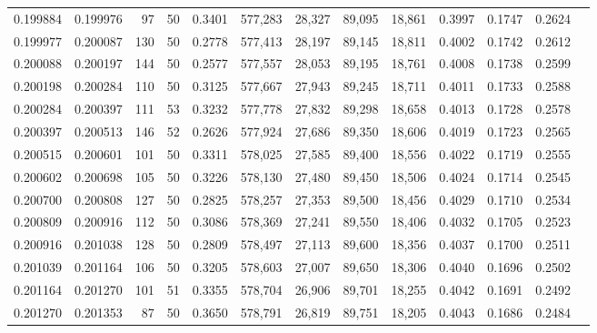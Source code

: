 \begin{tabular}{rrrrrrrrrrrrr}
0.199884 & 0.199976 &    97 &  50 &                                     0.3401 & 577,283 &  28,327 &  89,095 &  18,861 & 0.3997 & 0.1747 & 0.2624 \\
0.199977 & 0.200087 &   130 &  50 &                                     0.2778 & 577,413 &  28,197 &  89,145 &  18,811 & 0.4002 & 0.1742 & 0.2612 \\
0.200088 & 0.200197 &   144 &  50 &                                     0.2577 & 577,557 &  28,053 &  89,195 &  18,761 & 0.4008 & 0.1738 & 0.2599 \\
0.200198 & 0.200284 &   110 &  50 &                                     0.3125 & 577,667 &  27,943 &  89,245 &  18,711 & 0.4011 & 0.1733 & 0.2588 \\
0.200284 & 0.200397 &   111 &  53 &                                     0.3232 & 577,778 &  27,832 &  89,298 &  18,658 & 0.4013 & 0.1728 & 0.2578 \\
0.200397 & 0.200513 &   146 &  52 &                                     0.2626 & 577,924 &  27,686 &  89,350 &  18,606 & 0.4019 & 0.1723 & 0.2565 \\
0.200515 & 0.200601 &   101 &  50 &                                     0.3311 & 578,025 &  27,585 &  89,400 &  18,556 & 0.4022 & 0.1719 & 0.2555 \\
0.200602 & 0.200698 &   105 &  50 &                                     0.3226 & 578,130 &  27,480 &  89,450 &  18,506 & 0.4024 & 0.1714 & 0.2545 \\
0.200700 & 0.200808 &   127 &  50 &                                     0.2825 & 578,257 &  27,353 &  89,500 &  18,456 & 0.4029 & 0.1710 & 0.2534 \\
0.200809 & 0.200916 &   112 &  50 &                                     0.3086 & 578,369 &  27,241 &  89,550 &  18,406 & 0.4032 & 0.1705 & 0.2523 \\
0.200916 & 0.201038 &   128 &  50 &                                     0.2809 & 578,497 &  27,113 &  89,600 &  18,356 & 0.4037 & 0.1700 & 0.2511 \\
0.201039 & 0.201164 &   106 &  50 &                                     0.3205 & 578,603 &  27,007 &  89,650 &  18,306 & 0.4040 & 0.1696 & 0.2502 \\
0.201164 & 0.201270 &   101 &  51 &                                     0.3355 & 578,704 &  26,906 &  89,701 &  18,255 & 0.4042 & 0.1691 & 0.2492 \\
0.201270 & 0.201353 &    87 &  50 &                                     0.3650 & 578,791 &  26,819 &  89,751 &  18,205 & 0.4043 & 0.1686 & 0.2484 \\

\end{tabular}

